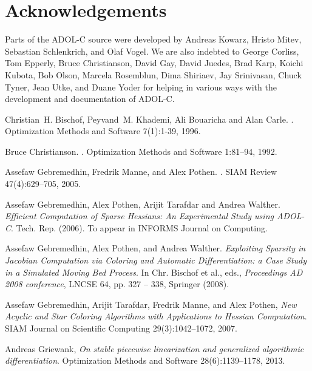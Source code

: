 \documentclass[11pt,twoside]{article}
\begin{document}
\section*{Acknowledgements}
%
Parts of the ADOL-C source were developed by Andreas
Kowarz, Hristo Mitev, Sebastian Schlenkrich,  and Olaf
Vogel. We are also indebted to George Corliss, 
Tom Epperly, Bruce Christianson, David Gay,  David Juedes,
Brad Karp, Koichi Kubota, Bob Olson,  Marcela Rosemblun, Dima
Shiriaev, Jay Srinivasan, Chuck Tyner, Jean Utke, and Duane Yoder for helping in
various ways with the development and documentation of ADOL-C. 
%
\begin{thebibliography}{10}

Christian~H. Bischof, Peyvand~M. Khademi, Ali Bouaricha and Alan Carle.
.
\newblock Optimization Methods and Software 7(1):1-39, 1996.

Bruce Christianson.
.
\newblock  Optimization Methods and Software 1:81--94, 1992.

Assefaw Gebremedhin, Fredrik Manne, and Alex Pothen.
.
\newblock SIAM Review 47(4):629--705, 2005.

Assefaw Gebremedhin, Alex Pothen, Arijit Tarafdar and Andrea Walther. 
{\em Efficient Computation of Sparse Hessians: An Experimental Study
  using ADOL-C}. Tech. Rep. (2006). To appear in INFORMS Journal on Computing.

 Assefaw Gebremedhin, Alex Pothen, and Andrea
  Walther. 
{\em Exploiting  Sparsity  in Jacobian Computation via Coloring and Automatic Differentiation: 
a Case Study in a Simulated Moving Bed Process}. 
In Chr. Bischof et al., eds.,  {\em Proceedings AD 2008 conference}, LNCSE 64, pp. 327 -- 338, Springer (2008).

Assefaw Gebremedhin, Arijit Tarafdar, Fredrik Manne, and Alex Pothen,
{\em New Acyclic and Star Coloring Algorithms with Applications to Hessian Computation}.
SIAM Journal on Scientific Computing 29(3):1042--1072, 2007.

Andreas Griewank,
{\em On stable piecewise linearization and generalized algorithmic differentiation}.
Optimization Methods and Software 28(6):1139--1178, 2013.


\end{thebibliography}
\end{document}
